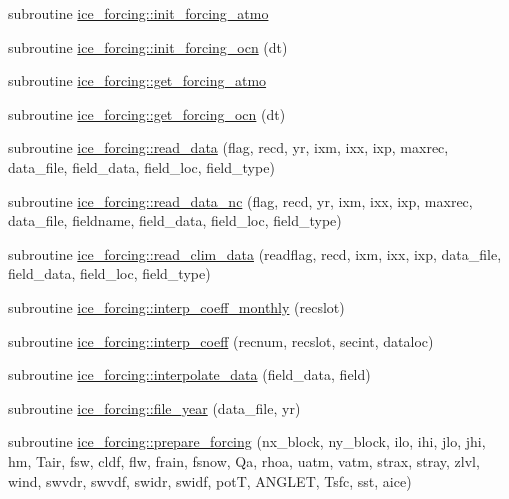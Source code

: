 \begin{DoxyCompactItemize}
\item 
subroutine \hyperlink{namespaceice__forcing_aa113a0f4916cea9631de05496daf36c6}{ice\_\-forcing::init\_\-forcing\_\-atmo}
\item 
subroutine \hyperlink{namespaceice__forcing_a53be2f27b17125aea7195b3e14874b44}{ice\_\-forcing::init\_\-forcing\_\-ocn} (dt)
\item 
subroutine \hyperlink{namespaceice__forcing_ab2f60fb9ecb6411647c4995b88de8732}{ice\_\-forcing::get\_\-forcing\_\-atmo}
\item 
subroutine \hyperlink{namespaceice__forcing_a3c95ab18cff7177ae785d882338cd72e}{ice\_\-forcing::get\_\-forcing\_\-ocn} (dt)
\item 
subroutine \hyperlink{namespaceice__forcing_a45d48692f330fef1618489012ca9d0a7}{ice\_\-forcing::read\_\-data} (flag, recd, yr, ixm, ixx, ixp, maxrec, data\_\-file, field\_\-data, field\_\-loc, field\_\-type)
\item 
subroutine \hyperlink{namespaceice__forcing_a33953eccfa9abefcd935133786fa04b3}{ice\_\-forcing::read\_\-data\_\-nc} (flag, recd, yr, ixm, ixx, ixp, maxrec, data\_\-file, fieldname, field\_\-data, field\_\-loc, field\_\-type)
\item 
subroutine \hyperlink{namespaceice__forcing_ae59c1f1aebe7408876c324fd7e2f5e5f}{ice\_\-forcing::read\_\-clim\_\-data} (readflag, recd, ixm, ixx, ixp, data\_\-file, field\_\-data, field\_\-loc, field\_\-type)
\item 
subroutine \hyperlink{namespaceice__forcing_a9da649682a06b9b9fb085742a770d940}{ice\_\-forcing::interp\_\-coeff\_\-monthly} (recslot)
\item 
subroutine \hyperlink{namespaceice__forcing_a9357ad1d7f2850b9ac32cb5f6b6aa7cb}{ice\_\-forcing::interp\_\-coeff} (recnum, recslot, secint, dataloc)
\item 
subroutine \hyperlink{namespaceice__forcing_aaa8b12715d3c39535f631da2fcc76c21}{ice\_\-forcing::interpolate\_\-data} (field\_\-data, field)
\item 
subroutine \hyperlink{namespaceice__forcing_a4dc16c54400bfdb9cdf1298aa63d7c0f}{ice\_\-forcing::file\_\-year} (data\_\-file, yr)
\item 
subroutine \hyperlink{namespaceice__forcing_af5f411a97331efb9556841318e740684}{ice\_\-forcing::prepare\_\-forcing} (nx\_\-block, ny\_\-block, ilo, ihi, jlo, jhi, hm, Tair, fsw, cldf, flw, frain, fsnow, Qa, rhoa, uatm, vatm, strax, stray, zlvl, wind, swvdr, swvdf, swidr, swidf, potT, ANGLET, Tsfc, sst, aice)

\end{DoxyCompactItemize}
